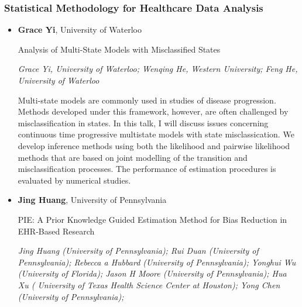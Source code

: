 \subsubsection*{Statistical Methodology for Healthcare Data Analysis}

\begin{itemize}
\item \textbf{Grace Yi}, University of Waterloo

Analysis of Multi-State Models with Misclassified States

\emph{\footnotesize Grace Yi, University of Waterloo; Wenqing He, Western University; Feng He, University of Waterloo}

Multi-state models are commonly used in studies of disease progression. Methods developed under this framework, however, are often challenged by misclassification in states. In this talk, I will discuss issues concerning continuous time progressive multistate models with state misclassication. We develop inference methods using both the likelihood and pairwise likelihood methods that are based on joint modelling of the transition and misclassification processes. The performance of estimation procedures is evaluated by numerical studies.

\item \textbf{Jing Huang}, University of Pennsylvania

PIE: A Prior Knowledge Guided Estimation Method for Bias Reduction in EHR-Based Research

\emph{\footnotesize Jing Huang (University of Pennsylvania);  Rui Duan (University of Pennsylvania);  Rebecca a Hubbard (University of Pennsylvania);  Yonghui Wu (University of Florida); Jason H Moore (University of Pennsylvania); Hua Xu ( University of Texas Health Science Center at Houston);  Yong Chen (University of Pennsylvania);}


\end{itemize}
